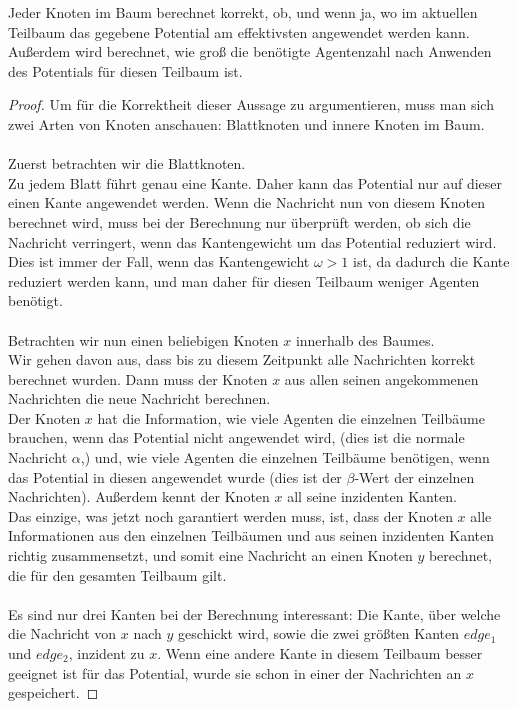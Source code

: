 	\begin{theorem}
		Jeder Knoten im Baum berechnet korrekt, ob, und wenn ja, wo im aktuellen Teilbaum das gegebene Potential am effektivsten angewendet werden kann. Außerdem wird berechnet, wie groß die benötigte Agentenzahl nach Anwenden des Potentials für diesen Teilbaum ist.
	\end{theorem}
	\begin{proof}
		Um für die Korrektheit dieser Aussage zu argumentieren, muss man sich zwei Arten von Knoten anschauen: Blattknoten und innere Knoten im Baum.\\
		\\
		Zuerst betrachten wir die Blattknoten.\\
		Zu jedem Blatt führt genau eine Kante. Daher kann das Potential nur auf dieser einen Kante angewendet werden. Wenn die Nachricht nun von diesem Knoten berechnet wird, muss bei der Berechnung nur überprüft werden, ob sich die Nachricht verringert, wenn das Kantengewicht um das Potential reduziert wird. Dies ist immer der Fall, wenn das Kantengewicht $\omega > 1$ ist, da dadurch die Kante reduziert werden kann, und man daher für diesen Teilbaum weniger Agenten benötigt.
		\\
		\\
		Betrachten wir nun einen beliebigen Knoten $x$ innerhalb des Baumes.\\
		Wir gehen davon aus, dass bis zu diesem Zeitpunkt alle Nachrichten korrekt berechnet wurden. Dann muss der Knoten $x$ aus allen seinen angekommenen Nachrichten die neue Nachricht berechnen.\\
		Der Knoten $x$ hat die Information, wie viele Agenten die einzelnen Teilbäume brauchen, wenn das Potential nicht angewendet wird, (dies ist die normale Nachricht $\alpha$,) und, wie viele Agenten die einzelnen Teilbäume benötigen, wenn das Potential in diesen angewendet wurde (dies ist der $\beta$-Wert der einzelnen Nachrichten). Außerdem kennt der Knoten $x$ all seine inzidenten Kanten.\\
		Das einzige, was jetzt noch garantiert werden muss, ist, dass der Knoten $x$ alle Informationen aus den einzelnen Teilbäumen und aus seinen inzidenten Kanten richtig zusammensetzt, und somit eine Nachricht an einen Knoten $y$ berechnet, die für den gesamten Teilbaum gilt.\\
		\\
		Es sind nur drei Kanten bei der Berechnung interessant: Die Kante, über welche die Nachricht von $x$ nach $y$ geschickt wird, sowie die zwei größten Kanten $edge_1$ und $edge_2$, inzident zu $x$. Wenn eine andere Kante in diesem Teilbaum besser geeignet ist für das Potential, wurde sie schon in einer der Nachrichten an $x$ gespeichert. 

\end{proof}
